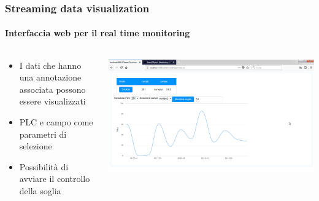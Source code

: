 \documentclass{beamer}
\begin{document}
\begin{frame}
\frametitle{Streaming data visualization}
\framesubtitle{Interfaccia web per il real time monitoring}
\begin{columns}[T] %
	\begin{column}{.3\textwidth}
		\begin{itemize}
			\small
			\item I dati che hanno una annotazione associata possono essere visualizzati
			\item PLC e campo come parametri di selezione
			\item Possibilità di avviare il controllo della soglia
		\end{itemize}
	\end{column}%
	\hfill%
	\begin{column}{.66\textwidth}
		\includegraphics[width=1\textwidth]{images/grafico-zk.png}
	\end{column}%
\end{columns}

\end{frame}
\end{document}
